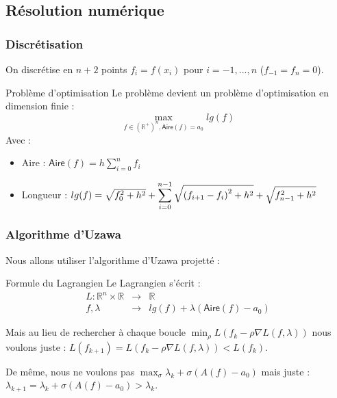 \documentclass[11pt,envcountsect,aspectratio=169]{beamer} %
\newcommand{\R}{\mathbb{R}}
\newcommand{\A}{\mathsf{Aire}}
\begin{document}
\subsection{Résolution numérique}

\begin{frame}
    \frametitle{Discrétisation}

    On discrétise en $n+2$ points $f_i = f(x_i)$ pour $i=-1,...,n$ ($f_{-1}=f_n=0$).

    \begin{beamerboxesrounded}[upper=titreB,lower=texteB,shadow=true]{Problème d'optimisation}
        Le problème devient un problème d'optimisation en dimension finie :
        \[\max_{f \in \left(\R^+\right)^n, \A(f)=a_0} lg(f)\]
        Avec :
        \begin{itemize}
            \item Aire : $\A(f) = h \sum_{i=0}^n{f_i}$
            \item Longueur : $lg(f) =  \sqrt{f_0^2+h^2} + \displaystyle\sum_{i=0}^{n-1}{\sqrt{\vphantom{f_n^2}{(f_{i+1}-f_i)}^2+h^2}} + \sqrt{f_{n-1}^2+h^2} $
        \end{itemize}
    \end{beamerboxesrounded}

\end{frame}

\begin{frame}
    \frametitle{Algorithme d'Uzawa}
    
    Nous allons utiliser l'algorithme d'Uzawa projetté :
    
    \begin{beamerboxesrounded}[upper=titreB,lower=texteB,shadow=true]{Formule du Lagrangien}
        Le Lagrangien s'écrit :
        \begin{eqnarray*}
            L \colon \R^n \times \R &\rightarrow & \R \\
            f, \lambda &\rightarrow & lg(f) + \lambda (\A(f)-a_0)
        \end{eqnarray*}
    \end{beamerboxesrounded}
    
    Mais au lieu de rechercher à chaque boucle $\min_{\rho} L(f_k - \rho \nabla L(f,\lambda))$ nous voulons juste : $L(f_{k+1}) = L(f_k - \rho \nabla L(f,\lambda)) < L(f_k)$.
    
    De même, nous ne voulons pas $\max_{\sigma} \lambda_k + \sigma (A(f)-a_0)$ mais juste : $\lambda_{k+1} = \lambda_k + \sigma (A(f)-a_0) > \lambda_k$.
    
\end{frame}
\end{document}
